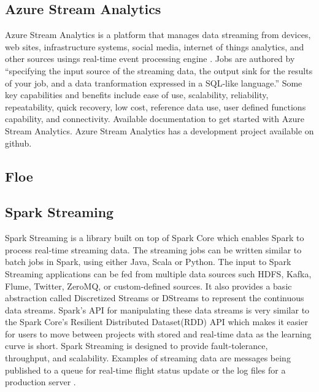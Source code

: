 \subsection{Azure Stream Analytics \cv}

     Azure Stream Analytics is a platform that manages data streaming
     from devices, web sites, infrastructure systems, social media,
     internet of things analytics, and other sources usings real-time
     event processing engine \cite{www-azurestreamanalytics}. Jobs
     are authored by ``specifying the input source of the streaming
     data, the output sink for the results of your job, and a data
     tranformation expressed in a SQL-like language.''  Some key
     capabilities and benefits include ease of use, scalability,
     reliability, repeatability, quick recovery, low cost, reference
     data use, user defined functions capability, and
     connectivity. \cite{www-docs-microsoft} Available documentation
     to get started with Azure Stream
     Analytics. \cite{www-github-azure} Azure Stream Analytics has a
     development project available on github.

     
\subsection{Floe}
\subsection{Spark Streaming}

     Spark Streaming is a library built on top of Spark Core which
     enables Spark to process real-time streaming data. The streaming
     jobs can be written similar to batch jobs in Spark, using either
     Java, Scala or Python. The input to Spark Streaming applications
     can be fed from multiple data sources such HDFS, Kafka, Flume,
     Twitter, ZeroMQ, or custom-defined sources. It also provides a
     basic abstraction called Discretized Streams or DStreams to
     represent the continuous data streams. Spark's API for
     manipulating these data streams is very similar to the Spark
     Core’s Resilient Distributed Dataset(RDD) API
     \cite{www-apache-spark-RDD} which makes it easier for users to
     move between projects with stored and real-time data as the
     learning curve is short.  Spark Streaming is designed to provide
     fault-tolerance, throughput, and scalability. Examples of
     streaming data are messages being published to a queue for
     real-time flight status update or the log files for a production
     server \cite{www-apache-spark-stream}.
     
